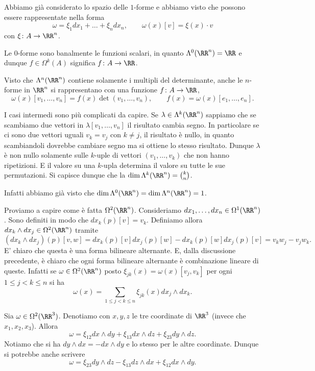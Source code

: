 Abbiamo già considerato lo spazio delle $1$-forme e abbiamo 
visto che possono essere rappresentate nella forma 
\[
  \omega = \xi_1 dx_1 + \dots + \xi_n dx_n, \qquad \omega(x)[v] = \xi(x)\cdot v
\]
con $\xi\colon A \to \RR^n$.

Le $0$-forme sono banalmente le funzioni scalari, in quanto $\Lambda^0(\RR^n)= \RR$
e dunque $f \in \Omega^k(A)$ significa $f\colon A \to \RR$.

Visto che $\Lambda^n(\RR^n)$ contiene solamente i multipli del determinante, 
anche le $n$-forme in $\RR^n$ si rappresentano con una funzione $f\colon A\to\RR$, 
\[
 \omega(x)[v_1,\dots,v_n] = f(x) \det(v_1, \dots, v_n),\qquad f(x) = \omega(x)[e_1,\dots,e_n].
\]

I casi intermedi sono più complicati da capire.
Se $\lambda\in \Lambda^k(\RR^n)$ sappiamo che se scambiamo due vettori 
in $\lambda[v_1,\dots,v_n]$ il risultato cambia segno. 
In particolare se ci sono due vettori uguali $v_k=v_j$ con $k\neq j$, il risultato 
è nullo, in quanto scambiandoli dovrebbe cambiare segno ma si ottiene lo stesso risultato.
Dunque $\lambda$ è non nullo solamente sulle $k$-uple di vettori $(v_1,\dots,v_k)$ 
che non hanno ripetizioni. E il valore su una $k$-upla determina il valore su tutte le sue 
permutazioni. 
Si capisce dunque che la $\dim \Lambda^k(\RR^n) = {k \choose n}$.

Infatti abbiamo già visto che $\dim \Lambda^0(\RR^n)=\dim \Lambda^n(\RR^n) = 1$.

Proviamo a capire come è fatta $\Omega^2(\RR^n)$. 
Consideriamo $dx_1,\dots, dx_n \in \Omega^1(\RR^n)$. 
Sono definiti in modo che $dx_k(p)[v] = v_k$.
Definiamo allora 
$dx_k \wedge dx_j\in \Omega^2(\RR^n)$ tramite
\[
    (dx_k\wedge dx_j)(p) [v,w] = dx_k(p)[v] dx_j(p)[w] - dx_k(p)[w] dx_j(p)[v]
      = v_k w_j - v_j w_k. 
\]
E' chiaro che questa è una forma bilineare alternante.
E, dalla discussione precedente, è chiaro che ogni forma bilineare alternante 
è combinazione lineare di queste.
Infatti se $\omega \in \Omega^2(\RR^n)$ 
posto $\xi_{jk}(x) = \omega(x)[v_j,v_k]$ per ogni $1\le j<k\le n$
si ha 
\[
  \omega(x) = \sum_{1\le j < k \le n} \xi_{jk}(x) dx_j\wedge dx_k.
\] 

\begin{example}[$2$-forme in $\RR^3$]
Sia $\omega \in \Omega^2(\RR^3)$. 
Denotiamo con $x,y,z$ le tre coordinate di $\RR^3$ (invece che $x_1,x_2,x_3$).
Allora
\[
  \omega = \xi_{12} dx\wedge dy + \xi_{13} dx\wedge dz + \xi_{23} dy \wedge dz.
\] 
Notiamo che si ha $dy\wedge dx = - dx\wedge dy$ e lo stesso per le altre coordinate.
Dunque si potrebbe anche scrivere 
\[
 \omega = \xi_{23} dy \wedge dz - \xi_{13} dz\wedge dx + \xi_{12} dx\wedge dy.
\]
\end{example}

